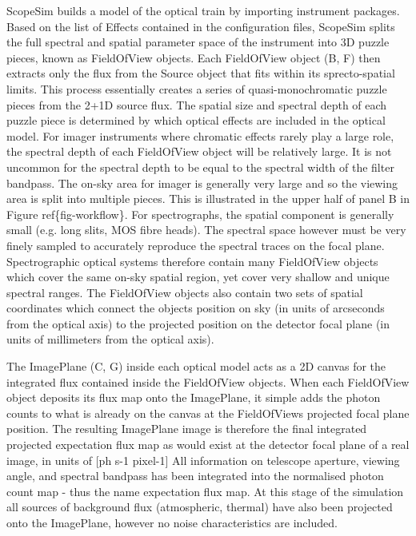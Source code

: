 ScopeSim builds a model of the optical train by importing instrument packages.
Based on the list of Effects contained in the configuration files, ScopeSim splits the full spectral and spatial parameter space of the instrument into 3D \textquotedbl{}puzzle\textquotedbl{} pieces, known as FieldOfView objects.
Each FieldOfView object (B, F) then extracts only the flux from the Source object that fits within its sprecto-spatial limits.
This process essentially creates a series of quasi-monochromatic puzzle pieces from the 2+1D source flux.
The spatial size and spectral depth of each puzzle piece is determined by which optical effects are included in the optical model.
For imager instruments where chromatic effects rarely play a large role, the spectral depth of each FieldOfView object will be relatively large.
It is not uncommon for the spectral depth to be equal to the spectral width of the filter bandpass.
The on-sky area for imager is generally very large and so the viewing area is split into multiple pieces.
This is illustrated in the upper half of panel B in Figure ref\{fig-workflow\}.
For spectrographs, the spatial component is generally small (e.g. long slits, MOS fibre heads).
The spectral space however must be very finely sampled to accurately reproduce the spectral traces on the focal plane.
Spectrographic optical systems therefore contain many FieldOfView objects which cover the same on-sky spatial region, yet cover very shallow and unique spectral ranges.
The FieldOfView objects also contain two sets of spatial coordinates which connect the objects position on sky (in units of arcseconds from the optical axis) to the projected position on the detector focal plane (in units of millimeters from the optical axis).

The ImagePlane (C, G) inside each optical model acts as a 2D canvas for the integrated flux contained inside the FieldOfView objects.
When each FieldOfView object deposits its flux map onto the ImagePlane, it simple adds the photon counts to what is already on the canvas at the FieldOfViews projected focal plane position.
The resulting ImagePlane image is therefore the final integrated projected expectation flux map as would exist at the detector focal plane of a real image, in units of {[}ph s-1 pixel-1{]}
All information on telescope aperture, viewing angle, and spectral bandpass has been integrated into the normalised photon count map - thus the name \textquotedbl{}expectation\textquotedbl{} flux map.
At this stage of the simulation all sources of background flux (atmospheric, thermal) have also been projected onto the ImagePlane, however no noise characteristics are included.

